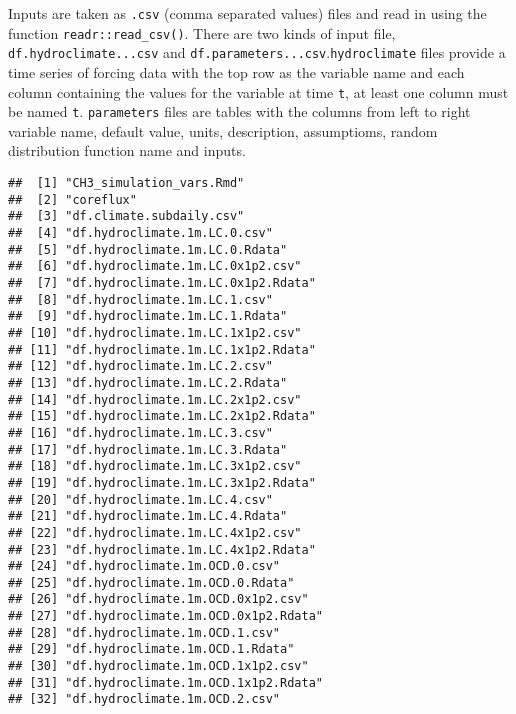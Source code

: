 \documentclass[
]{article}
\begin{document}
Inputs are taken as \texttt{.csv} (comma separated values) files and
read in using the function \texttt{readr::read\_csv()}. There are two
kinds of input file, \texttt{df.hydroclimate...csv} and
\texttt{df.parameters...csv}.\texttt{hydroclimate} files provide a time
series of forcing data with the top row as the variable name and each
column containing the values for the variable at time \texttt{t}, at
least one column must be named \texttt{t}. \texttt{parameters} files are
tables with the columns from left to right variable name, default value,
units, description, assumptioms, random distribution function name and
inputs.

\begin{verbatim}
##  [1] "CH3_simulation_vars.Rmd"                          
##  [2] "coreflux"                                         
##  [3] "df.climate.subdaily.csv"                          
##  [4] "df.hydroclimate.1m.LC.0.csv"                      
##  [5] "df.hydroclimate.1m.LC.0.Rdata"                    
##  [6] "df.hydroclimate.1m.LC.0x1p2.csv"                  
##  [7] "df.hydroclimate.1m.LC.0x1p2.Rdata"                
##  [8] "df.hydroclimate.1m.LC.1.csv"                      
##  [9] "df.hydroclimate.1m.LC.1.Rdata"                    
## [10] "df.hydroclimate.1m.LC.1x1p2.csv"                  
## [11] "df.hydroclimate.1m.LC.1x1p2.Rdata"                
## [12] "df.hydroclimate.1m.LC.2.csv"                      
## [13] "df.hydroclimate.1m.LC.2.Rdata"                    
## [14] "df.hydroclimate.1m.LC.2x1p2.csv"                  
## [15] "df.hydroclimate.1m.LC.2x1p2.Rdata"                
## [16] "df.hydroclimate.1m.LC.3.csv"                      
## [17] "df.hydroclimate.1m.LC.3.Rdata"                    
## [18] "df.hydroclimate.1m.LC.3x1p2.csv"                  
## [19] "df.hydroclimate.1m.LC.3x1p2.Rdata"                
## [20] "df.hydroclimate.1m.LC.4.csv"                      
## [21] "df.hydroclimate.1m.LC.4.Rdata"                    
## [22] "df.hydroclimate.1m.LC.4x1p2.csv"                  
## [23] "df.hydroclimate.1m.LC.4x1p2.Rdata"                
## [24] "df.hydroclimate.1m.OCD.0.csv"                     
## [25] "df.hydroclimate.1m.OCD.0.Rdata"                   
## [26] "df.hydroclimate.1m.OCD.0x1p2.csv"                 
## [27] "df.hydroclimate.1m.OCD.0x1p2.Rdata"               
## [28] "df.hydroclimate.1m.OCD.1.csv"                     
## [29] "df.hydroclimate.1m.OCD.1.Rdata"                   
## [30] "df.hydroclimate.1m.OCD.1x1p2.csv"                 
## [31] "df.hydroclimate.1m.OCD.1x1p2.Rdata"               
## [32] "df.hydroclimate.1m.OCD.2.csv"                     

\end{verbatim}
\end{document}
